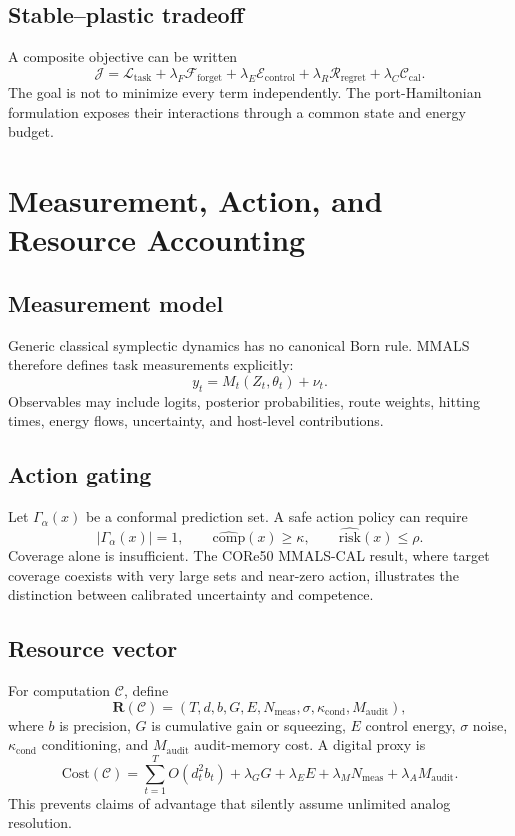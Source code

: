 \documentclass[11pt]{article}
\theoremstyle{definition}\newtheorem{definition}{Definition}\newtheorem{assumption}{Assumption}
\theoremstyle{remark}\newtheorem{remark}{Remark}
\begin{document}
\subsection{Stable--plastic tradeoff}
A composite objective can be written
\begin{equation}
\mathcal J=\mathcal L_{\mathrm{task}}+\lambda_F\mathcal F_{\mathrm{forget}}+\lambda_E\mathcal E_{\mathrm{control}}+\lambda_R\mathcal R_{\mathrm{regret}}+\lambda_C\mathcal C_{\mathrm{cal}}.
\end{equation}
The goal is not to minimize every term independently. The port-Hamiltonian formulation exposes their interactions through a common state and energy budget.

\section{Measurement, Action, and Resource Accounting}
\subsection{Measurement model}
Generic classical symplectic dynamics has no canonical Born rule. MMALS therefore defines task measurements explicitly:
\begin{equation}
y_t=M_t(Z_t,\theta_t)+\nu_t.
\end{equation}
Observables may include logits, posterior probabilities, route weights, hitting times, energy flows, uncertainty, and host-level contributions.

\subsection{Action gating}
Let $\Gamma_\alpha(x)$ be a conformal prediction set. A safe action policy can require
\begin{equation}
|\Gamma_\alpha(x)|=1,\qquad \widehat{\mathrm{comp}}(x)\ge\kappa,\qquad \widehat{\mathrm{risk}}(x)\le\rho.
\end{equation}
Coverage alone is insufficient. The CORe50 MMALS-CAL result, where target coverage coexists with very large sets and near-zero action, illustrates the distinction between calibrated uncertainty and competence.

\subsection{Resource vector}
For computation $\mathcal C$, define
\begin{equation}
\mathbf R(\mathcal C)=(T,d,b,G,E,N_{\mathrm{meas}},\sigma,\kappa_{\mathrm{cond}},M_{\mathrm{audit}}),
\end{equation}
where $b$ is precision, $G$ is cumulative gain or squeezing, $E$ control energy, $\sigma$ noise, $\kappa_{\mathrm{cond}}$ conditioning, and $M_{\mathrm{audit}}$ audit-memory cost. A digital proxy is
\begin{equation}
\mathrm{Cost}(\mathcal C)=\sum_{t=1}^T O(d_t^2b_t)+\lambda_GG+\lambda_EE+\lambda_MN_{\mathrm{meas}}+\lambda_A M_{\mathrm{audit}}.
\end{equation}
This prevents claims of advantage that silently assume unlimited analog resolution.
\end{document}
